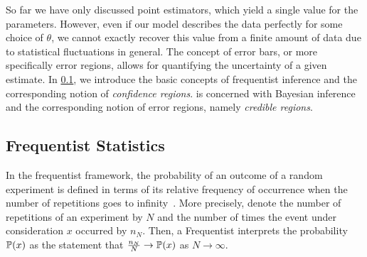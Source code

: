 So far we have only discussed point estimators, which yield a single value for the parameters.
However, even if our model describes the data perfectly for some choice of $\theta$, we cannot exactly recover this value from a finite amount of data due to statistical fluctuations in general.
The concept of error bars, or more specifically error regions, allows for quantifying the uncertainty of a given estimate.
In \cref{sub:stat.frequentist}, we introduce the basic concepts of frequentist inference and the corresponding notion of \emph{confidence regions}.
 is concerned with Bayesian inference and the corresponding notion of error regions, namely \emph{credible regions}.



\subsection{Frequentist Statistics}%
\label{sub:stat.frequentist}

In the frequentist framework, the probability of an outcome of a random experiment is defined in terms of its relative frequency of occurrence when the number of repetitions goes to infinity~\cite{Keynes_2007_Treatise,Kiefer_2012_Introduction}.
More precisely, denote the number of repetitions of an experiment by $N$ and the number of times the event under consideration $x$ occurred by $n_N$.
Then, a Frequentist interprets the probability $\mathbb{P}(x)$ as the statement that $\frac{n_N}{N} \to \mathbb{P}(x)$ as $N \to \infty$.

